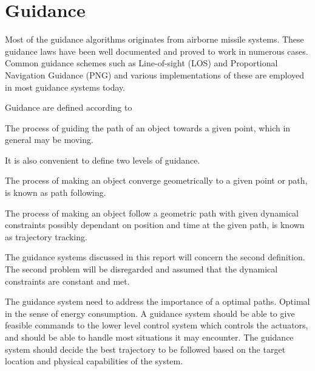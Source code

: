 \section{Guidance}
        \label{chap1-guidance-alg}
	Most of the guidance algorithms originates from airborne missile systems. These guidance laws have been well
	documented and proved to work in numerous cases. Common guidance schemes such as Line-of-sight (LOS)
	and Proportional Navigation Guidance (PNG) and various implementations of these are employed in
	most guidance systems today. 
	
	Guidance are defined according to \cite{guidance_def}
	\begin{definition}
		\label{def:ch1_guidance}
		The process of guiding the path of an object towards a given point, which in general may be
		moving.
	\end{definition}
	It is also convenient to define two levels of guidance.
	\begin{definition}
		The process of making an object converge geometrically to a given point or path, is known as
		path following.
	\end{definition}
	\begin{definition}
		The process of making an object follow a geometric path with given dynamical constraints
		possibly dependant on position and time at the given path, is known as trajectory tracking.
	\end{definition}
	The guidance systems discussed in this report will concern the second definition. The second problem will be
	disregarded and assumed that the dynamical constraints are constant and met. \cite{guidance-path-2d-3d}

	The guidance system need to address the importance of a optimal paths. Optimal in the sense
	of energy consumption. A guidance system should be able to give 
	feasible commands to the lower level control system which controls the actuators, and should be able
	to handle most situations it may encounter. The guidance system should decide the best trajectory to be
	followed based on the target location and physical capabilities of the system.\cite{GuidanceReview}

